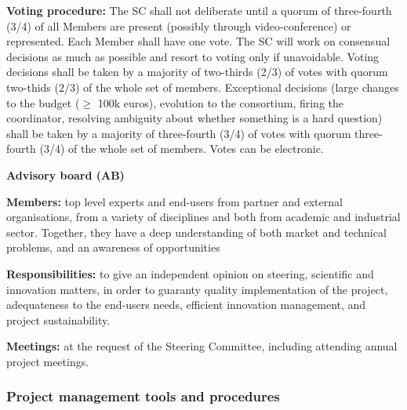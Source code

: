 \begin{description}
\textbf{Voting procedure:} The SC shall not deliberate until a quorum
of three-fourth (3/4) of all Members are present (possibly through
video-conference) or represented. Each Member shall have one vote. The
SC will work on consensual decisions as much as possible and resort to
voting only if unavoidable. Voting decisions shall be taken by a
majority of two-thirds (2/3) of votes with quorum two-thids (2/3) of
the whole set of members. Exceptional decisions (large changes to the
budget ($\geq$ 100k euros), evolution to the consortium, firing the
coordinator, resolving ambiguity about whether something is a hard
question) shall be taken by a majority of three-fourth (3/4) of votes
with quorum three-fourth (3/4) of the whole set of members. Votes can
be electronic.

\item{\textbf{Advisory board (AB)}} \nobreak\par

  \textbf{Members:} top level experts and end-users from partner and
  external organisations, from a variety of disciplines and both from
  academic and industrial sector. Together, they have a deep
  understanding of both market and technical problems, and an
  awareness of opportunities

  \textbf{Responsibilities:} to give an independent opinion on
  steering, scientific and innovation matters, in order to guaranty
  quality implementation of the project, adequateness to the end-users
  needs, efficient innovation management, and project sustainability.


  \textbf{Meetings:} at the request of the Steering Committee, including attending annual project meetings.
\end{description}

\subsubsection{Project management tools and procedures}


